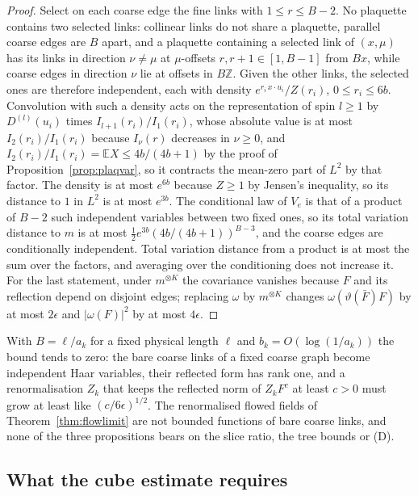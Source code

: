 \documentclass[aps,prd,twocolumn,superscriptaddress,nofootinbib,longbibliography,floatfix,amsmath,amssymb,10pt]{revtex4-2}
\theoremstyle{definition}
\theoremstyle{remark}
\newcommand{\Z}{\mathbb{Z}}
\newcommand{\E}{\mathbb{E}}
\begin{document}
\begin{proof}
Select on each coarse edge the fine links with $1\le r\le B-2$. No plaquette
contains two selected links: collinear links do not share a plaquette,
parallel coarse edges are $B$ apart, and a plaquette containing a selected link
of $(x,\mu)$ has its links in direction $\nu\ne\mu$ at $\mu$-offsets $r,r+1\in
[1,B-1]$ from $Bx$, while coarse edges in direction $\nu$ lie at offsets in
$B\Z$. Given the other links, the selected ones are therefore independent, each
with density $e^{r_i\,x\cdot u_i}/Z(r_i)$, $0\le r_i\le6b$. Convolution with
such a density acts on the representation of spin $l\ge1$ by $D^{(l)}(u_i)$
times $I_{l+1}(r_i)/I_1(r_i)$, whose absolute value is at most
$I_2(r_i)/I_1(r_i)$ because $I_\nu(r)$ decreases in $\nu\ge0$, and
$I_2(r_i)/I_1(r_i)=\E X\le4b/(4b+1)$ by the proof of
Proposition~\ref{prop:plaqvar}, so it contracts the mean-zero part of $L^2$ by
that factor. The density is at most $e^{6b}$ because $Z\ge1$ by Jensen's
inequality, so its distance to $1$ in $L^2$ is at most $e^{3b}$. The
conditional law of $V_e$ is that of a product of $B-2$ such independent
variables between two fixed ones, so its total variation distance to $m$ is at
most $\frac12e^{3b}(4b/(4b+1))^{B-3}$, and the coarse edges are conditionally
independent. Total variation distance from a product is at most the sum over
the factors, and averaging over the conditioning does not increase it.
For the last statement, under $m^{\otimes K}$ the covariance vanishes because
$F$ and its reflection depend on disjoint edges; replacing $\omega$ by
$m^{\otimes K}$ changes $\omega(\vartheta(\bar F)F)$ by at most $2\epsilon$ and
$|\omega(F)|^2$ by at most $4\epsilon$.
\end{proof}

With $B=\ell/a_k$ for a fixed physical length $\ell$ and $b_k=O(\log(1/a_k))$
the bound tends to zero: the bare coarse links of a fixed coarse graph become
independent Haar variables, their reflected form has rank one, and a
renormalisation $Z_k$ that keeps the reflected norm of $Z_kF^c$ at least $c>0$
must grow at least like $(c/6\epsilon)^{1/2}$. The renormalised flowed fields
of Theorem~\ref{thm:flowlimit} are not bounded functions of bare coarse links,
and none of the three propositions bears on the slice ratio, the tree bounds or
(D).

\subsection{What the cube estimate requires}\label{ssec:cubeneeds}
\end{document}
